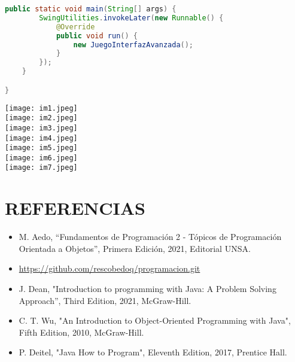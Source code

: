 \documentclass{article}
\begin{document}
\begin{itemize}
\begin{lstlisting}[language=java]
    public static void main(String[] args) {
        SwingUtilities.invokeLater(new Runnable() {
            @Override
            public void run() {
                new JuegoInterfazAvanzada();
            }
        });
    }

}

        \end{lstlisting}
        \centering
        \texttt{[image: im1.jpeg]}
        \\
        \texttt{[image: im2.jpeg]}
        \\
        \texttt{[image: im3.jpeg]}
        \\
        \texttt{[image: im4.jpeg]}
        \\
        \texttt{[image: im5.jpeg]}
        \\
        \texttt{[image: im6.jpeg]}
        \\
        \texttt{[image: im7.jpeg]}
        \\
	\end{itemize}

	\section{REFERENCIAS}
	\begin{itemize}
		\item M. Aedo, “Fundamentos de Programación 2 - Tópicos de Programación Orientada a Objetos”, Primera Edición, 2021, Editorial UNSA.
		\item \url{https://github.com/rescobedoq/programacion.git}
		\item J. Dean, "Introduction to programming with Java: A Problem Solving Approach”, Third Edition, 2021, McGraw-Hill.
        \item C. T. Wu, "An Introduction to Object-Oriented Programming with Java", Fifth Edition, 2010, McGraw-Hill.
        \item P. Deitel, "Java How to Program", Eleventh Edition, 2017, Prentice Hall.
	\end{itemize}
	
%
%
%
			
\end{document}
